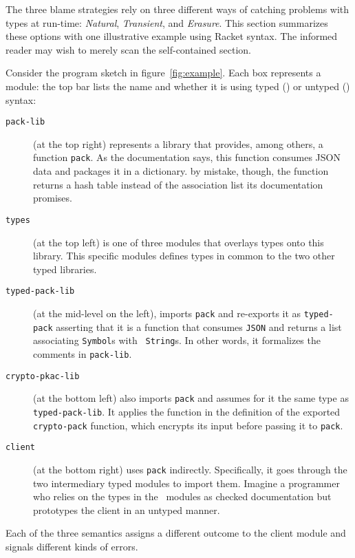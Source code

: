 
The three blame strategies rely on three different ways of catching problems
with types at run-time: {\em Natural\/}, {\em Transient\/}, and {\em
Erasure\/}. This section summarizes these options with one illustrative example
using Racket syntax. The informed reader may wish to merely scan the
self-contained section.

Consider the program sketch in figure~\ref{fig:example}. Each box represents a
module: the top bar lists the name and whether it is using typed (\typecolor) or
untyped (\dyncolor) syntax:
\begin{description}

\item[\texttt{pack-lib}] (at the top right) represents a library that provides,
among others, a function {\tt pack}. As the documentation says, this function
consumes JSON data and packages it in a dictionary. by mistake, though, the
function returns a hash table instead of the association list its documentation
promises.

\item[\texttt{types}] (at the top left) is one of three modules that overlays
types onto this library. This specific modules defines types in common to the
two other typed libraries. 

\item[\texttt{typed-pack-lib}] (at the mid-level on the left), imports {\tt pack}
and re-exports it as \texttt{typed-pack} asserting that it is a function that
consumes {\tt JSON} and returns a list associating {\tt Symbol}s with {\tt
String}s. In other words, it formalizes the comments in {\tt pack-lib}.

\item[\texttt{crypto-pkac-lib}] (at the bottom left) also imports \texttt{pack}
and assumes for it the same type as {\tt typed-pack-lib}. It applies the
function in the definition of the exported {\tt crypto-pack} function, which
encrypts its input before passing it to \texttt{pack}.

\item[\texttt{client}] (at the bottom right) uses {\tt pack}
indirectly. Specifically, it goes through the two intermediary typed modules to
import them. Imagine a programmer who relies on the types in the \typecolor\
modules as checked documentation but prototypes the client in an untyped manner.

\end{description}
Each of the three semantics assigns a different outcome to the client module and
signals different kinds of errors. 

